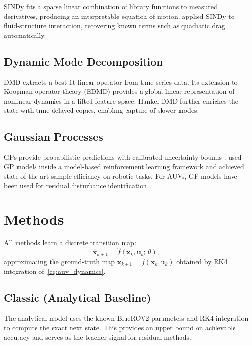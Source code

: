 \documentclass[conference]{IEEEtran}
\newcommand{\vx}{\mathbf{x}}
\newcommand{\vu}{\mathbf{u}}
\begin{document}
SINDy \cite{Brunton2016SINDy} fits a sparse linear combination of library
functions to measured derivatives, producing an interpretable equation of
motion. \cite{Quade2016SINDyFluid} applied SINDy to fluid-structure
interaction, recovering known terms such as quadratic drag automatically.

\subsection{Dynamic Mode Decomposition}

DMD \cite{Schmid2010DMD} extracts a best-fit linear operator from time-series
data. Its extension to Koopman operator theory \cite{Williams2015EDMD} (EDMD)
provides a global linear representation of nonlinear dynamics in a lifted
feature space. Hankel-DMD \cite{Arbabi2017Hankel} further enriches the state
with time-delayed copies, enabling capture of slower modes.

\subsection{Gaussian Processes}

GPs provide probabilistic predictions with calibrated uncertainty bounds
\cite{Rasmussen2006GP}. \cite{Deisenroth2011PILCO} used GP models inside
a model-based reinforcement learning framework and achieved
state-of-the-art sample efficiency on robotic tasks. For AUVs, GP models
have been used for residual disturbance identification \cite{Sarkka2013SPG}.

\section{Methods}
\label{sec:methods}

All methods learn a discrete transition map:
\begin{equation}
  \hat{\vx}_{k+1} = \hat{f}(\vx_k, \vu_k;\, \theta),
\end{equation}
approximating the ground-truth map $\vx_{k+1} = f(\vx_k, \vu_k)$
obtained by RK4 integration of~\eqref{eq:auv_dynamics}.

\subsection{Classic (Analytical Baseline)}

The analytical model uses the known BlueROV2 parameters and RK4 integration
to compute the exact next state. This provides an upper bound on achievable
accuracy and serves as the teacher signal for residual methods.
\end{document}
